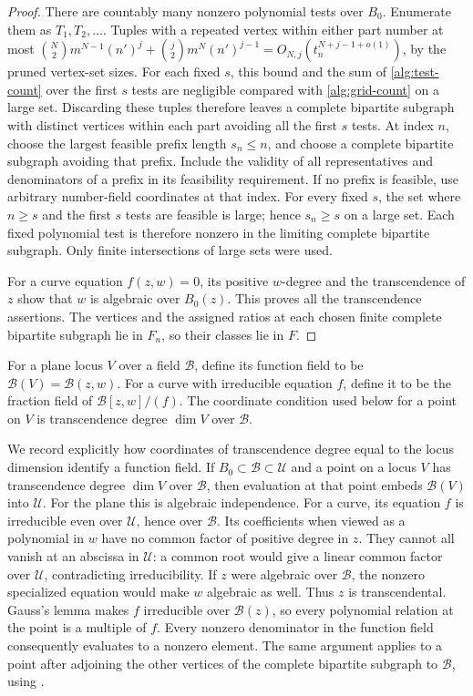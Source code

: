 \begin{proof}
There are countably many nonzero polynomial tests over \(B_0\).
Enumerate them as \(T_1,T_2,\ldots\). Tuples with a repeated vertex
within either part number at most
\(\binom{N}{2}m^{N-1}(n')^j+\binom{j}{2}m^N(n')^{j-1}
=O_{N,j}(t_n^{N+j-1+o(1)})\), by the pruned vertex-set sizes.
For each fixed \(s\), this bound and the sum of \eqref{alg:test-count}
over the first \(s\) tests are negligible compared with
\eqref{alg:grid-count} on a large set. Discarding these tuples
therefore leaves a complete bipartite subgraph with distinct vertices
within each part avoiding all the first \(s\) tests. At index \(n\),
choose the largest feasible prefix length
\(s_n\le n\), and choose a complete bipartite subgraph avoiding that prefix. Include the
validity of all representatives and denominators of a prefix in its
feasibility requirement. If no prefix is feasible, use arbitrary
number-field coordinates at that index. For every fixed \(s\), the
set where \(n\ge s\) and the first \(s\) tests are feasible is large;
hence \(s_n\ge s\) on a large set. Each fixed polynomial test is
therefore nonzero in the limiting complete bipartite subgraph. Only finite intersections of
large sets were used.

For a curve equation \(f(z,w)=0\), its positive \(w\)-degree and the
transcendence of \(z\) show that \(w\) is algebraic over \(B_0(z)\).
This proves all the transcendence assertions. The vertices and the
assigned ratios at each chosen finite complete bipartite subgraph lie in \(F_n\), so their
classes lie in \(F\).
\end{proof}

For a plane locus \(V\) over a field \(\mathcal B\), define its function
field to be \(\mathcal B(V)=\mathcal B(z,w)\). For a curve with
irreducible equation \(f\), define it to be the fraction field of
\(\mathcal B[z,w]/(f)\). The coordinate condition used below for a point on \(V\) is transcendence degree \(\dim V\) over \(\mathcal B\).

We record explicitly how coordinates of transcendence degree equal to the locus dimension identify a function field.
If \(B_0\subset\mathcal B\subset\mathcal U\) and a point on a locus
\(V\) has transcendence degree \(\dim V\) over \(\mathcal B\), then
evaluation at that point embeds \(\mathcal B(V)\) into \(\mathcal U\).
For the plane this is algebraic independence. For a curve, its equation
\(f\) is irreducible even over \(\mathcal U\), hence over
\(\mathcal B\). Its coefficients when viewed as a polynomial in \(w\)
have no common factor of positive degree in \(z\). They cannot all
vanish at an abscissa in \(\mathcal U\): a common root would give a
linear common factor over \(\mathcal U\), contradicting
irreducibility. If \(z\) were algebraic over \(\mathcal B\), the
nonzero specialized equation would make \(w\) algebraic as well.
Thus \(z\) is transcendental. Gauss's lemma makes \(f\)
irreducible over \(\mathcal B(z)\), so every polynomial relation at the
point is a multiple of \(f\). Every nonzero denominator in the function
field consequently evaluates to a nonzero element. The same argument
applies to a point after adjoining the other vertices of the complete bipartite subgraph to
\(\mathcal B\), using .

